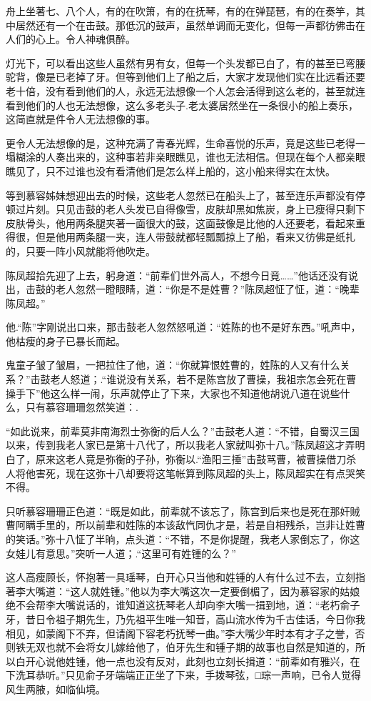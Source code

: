 \documentclass[12pt,oneside]{book}
\begin{document}
舟上坐著七、八个人，有的在吹箫，有的在抚琴，有的在弹琵琶，有的在奏竽，其中居然还有一个在击鼓。那低沉的鼓声，虽然单调而无变化，但每一声都彷佛击在人们的心上。令人神魂俱醉。

灯光下，可以看出这些人虽然有男有女，但每一个头发都已白了，有的甚至已弯腰驼背，像是已老掉了牙。但等到他们上了船之后，大家才发现他们实在比远看还要老十倍，没有看到他们的人，永远无法想像一个人怎会活得到这么老的，甚至就连看到他们的人也无法想像，这么多老头子.老太婆居然坐在一条很小的船上奏乐，这简直就是件令人无法想像的事。

更令人无法想像的是，这种充满了青春光辉，生命喜悦的乐声，竟是这些已老得一塌糊涂的人奏出来的，这种事若非亲眼瞧见，谁也无法相信。但现在每个人都亲眼瞧见了，只不过谁也没有看清他们是怎么样上船的，这小船来得实在太快。

等到慕容姊妹想迎出去的时候，这些老人忽然已在船头上了，甚至连乐声都没有停顿过片刻。只见击鼓的老人头发已自得像雪，皮肤却黑如焦炭，身上已瘦得只剩下皮肤骨头，他用两条腿夹著一面很大的鼓，这面鼓像是比他的人还要老，看起来重得很，但是他用两条腿一夹，连人带鼓就都轻瓢瓢掠上了船，看来又彷佛是纸扎的，只要一阵小风就能将他吹走。

陈凤超拾先迎了上去，躬身道：``前辈们世外高人，不想今日竟\ldots\ldots{}''他话还没有说出，击鼓的老人忽然一瞪眼睛，道：``你是不是姓曹？''陈凤超怔了怔，道：``晚辈陈凤超。''

他.``陈''字刚说出口来，那击鼓老人忽然怒吼道：``姓陈的也不是好东西。''吼声中，他枯瘦的身子已暴长而起。

鬼童子皱了皱眉，一把拉住了他，道：``你就算恨姓曹的，姓陈的人又有什么关系？''击鼓老人怒道；.``谁说没有关系，若不是陈宫放了曹操，我祖宗怎会死在曹操手下''他这么样一闹，乐声就停止了下来，大家也不知道他胡说八道在说些什么，只有慕容珊珊忽然笑道：.

``如此说来，前辈莫非南海烈士弥衡的后人么？''击鼓老人道：``不错，自蜀汉三国以来，传到我老人家已是第十八代了，所以我老人家就叫弥十八。''陈凤超这才弄明白了，原来这老人竟是弥衡的子孙，弥衡以.``渔阳三捶''击鼓骂曹，被曹操借刀杀人将他害死，现在这弥十八却要将这笔帐算到陈凤超的头上，陈凤超实在有点哭笑不得。

只听慕容珊珊正色道：``既是如此，前辈就不该忘了，陈宫到后来也是死在那奸贼曹阿瞒手里的，所以前辈和姓陈的本该敌忾同仇才是，若是自相残杀，岂非让姓曹的笑话。''弥十八怔了半晌，点头道：``不错，不是你提醒，我老人家倒忘了，你这女娃儿有意思。''突听一人道；.``这里可有姓锺的么？''

这人高瘦顾长，怀抱著一具瑶琴，白开心只当他和姓锺的人有什么过不去，立刻指著李大嘴道：``这人就姓锺。''他以为李大嘴这次一定要倒楣了，因为慕容家的姑娘绝不会帮李大嘴说话的，谁知道这抚琴老人却向李大嘴一揖到地，道：``老朽俞子牙，昔日令祖子期先生，乃先祖平生唯一知音，高山流水传为千古佳话，今日你我相见，如蒙阁下不弃，但请阁下容老朽抚琴一曲。''李大嘴少年时本有才子之誉，否则铁无双也就不会将女儿嫁给他了，伯牙先生和锺子期的故事也自然是知道的，所以白开心说他姓锺，他一点也没有反对，此刻也立刻长揖道：``前辈如有雅兴，在下洗耳恭听。''只见俞子牙端端正正坐了下来，手拨琴弦，□琮一声响，已令人觉得风生两腋，如临仙境。
\end{document}
